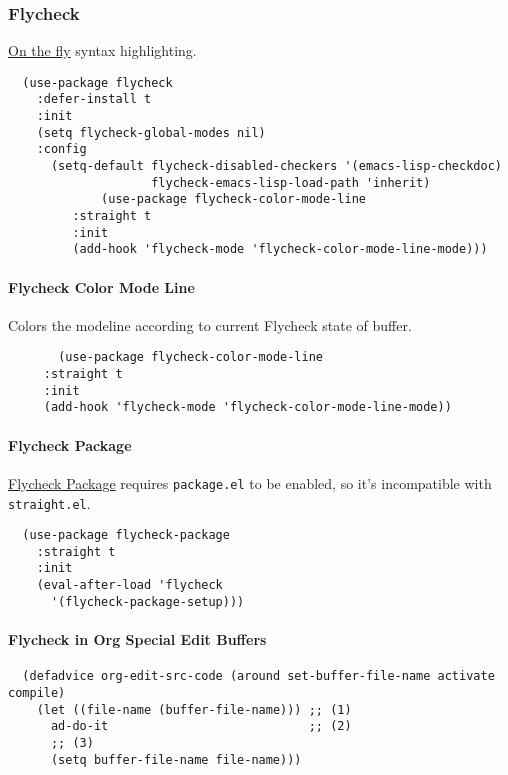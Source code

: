 \documentclass[11pt]{article}
\begin{document}
\subsubsection*{Flycheck}
\label{sec:org509c7c2}

\href{https://github.com/Flycheck/Flycheck}{On the fly} syntax highlighting.

\begin{verbatim}
  (use-package flycheck
    :defer-install t
    :init
    (setq flycheck-global-modes nil)
    :config
      (setq-default flycheck-disabled-checkers '(emacs-lisp-checkdoc)
                    flycheck-emacs-lisp-load-path 'inherit)
             (use-package flycheck-color-mode-line
      	 :straight t
      	 :init
      	 (add-hook 'flycheck-mode 'flycheck-color-mode-line-mode)))
\end{verbatim}

\paragraph*{Flycheck Color Mode Line}
\label{sec:org7f188cb}

Colors the modeline according to current Flycheck state of buffer.

\begin{verbatim}
       (use-package flycheck-color-mode-line
	 :straight t
	 :init
	 (add-hook 'flycheck-mode 'flycheck-color-mode-line-mode))
\end{verbatim}

\paragraph*{Flycheck Package}
\label{sec:org570c2ee}

\href{https://github.com/purcell/flycheck-package}{Flycheck Package} requires \texttt{package.el} to be enabled, so it's incompatible with \texttt{straight.el}.

\begin{verbatim}
  (use-package flycheck-package
    :straight t
    :init
    (eval-after-load 'flycheck
      '(flycheck-package-setup)))
\end{verbatim}

\paragraph*{Flycheck in Org Special Edit Buffers}
\label{sec:org8f1b5fc}

\begin{verbatim}
  (defadvice org-edit-src-code (around set-buffer-file-name activate compile)
    (let ((file-name (buffer-file-name))) ;; (1)
      ad-do-it                            ;; (2)
      ;; (3)
      (setq buffer-file-name file-name)))
\end{verbatim}
\end{document}
